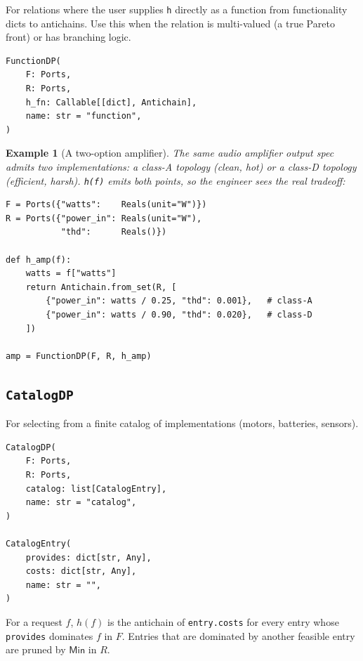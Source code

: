 \documentclass[11pt,a4paper]{article}
\newtheorem{example}[definition]{Example}
\newcommand{\Min}{\mathsf{Min}}
\begin{document}
For relations where the user supplies \texttt{h} directly as a
function from functionality dicts to antichains. Use this when the
relation is multi-valued (a true Pareto front) or has branching logic.

\begin{lstlisting}
FunctionDP(
    F: Ports,
    R: Ports,
    h_fn: Callable[[dict], Antichain],
    name: str = "function",
)
\end{lstlisting}

\begin{example}[A two-option amplifier]
The same audio amplifier output spec admits two implementations: a
class-A topology (clean, hot) or a class-D topology (efficient, harsh).
\texttt{h(f)} emits both points, so the engineer sees the real
tradeoff:
\begin{lstlisting}
F = Ports({"watts":    Reals(unit="W")})
R = Ports({"power_in": Reals(unit="W"),
           "thd":      Reals()})

def h_amp(f):
    watts = f["watts"]
    return Antichain.from_set(R, [
        {"power_in": watts / 0.25, "thd": 0.001},   # class-A
        {"power_in": watts / 0.90, "thd": 0.020},   # class-D
    ])

amp = FunctionDP(F, R, h_amp)
\end{lstlisting}
\end{example}

\subsection{\texttt{CatalogDP}}

For selecting from a finite catalog of implementations (motors,
batteries, sensors).

\begin{lstlisting}
CatalogDP(
    F: Ports,
    R: Ports,
    catalog: list[CatalogEntry],
    name: str = "catalog",
)

CatalogEntry(
    provides: dict[str, Any],
    costs: dict[str, Any],
    name: str = "",
)
\end{lstlisting}

For a request $f$, $h(f)$ is the antichain of \texttt{entry.costs}
for every entry whose \texttt{provides} dominates $f$ in $F$. Entries
that are dominated by another feasible entry are pruned by $\Min$ in
$R$.
\end{document}
